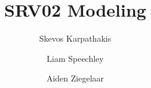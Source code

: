 \documentclass{article}
\begin{document}
\title{SRV02 Modeling}
\author{
Skevos Karpathakis \and
Liam Speechley \and
Aiden Ziegelaar
}
\maketitle
\newpage
\tableofcontents




\end{document}
